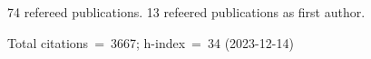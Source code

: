 74 refereed publications. 13 refeered publications as first author.

Total citations~=~3667; h-index~=~34 (2023-12-14)